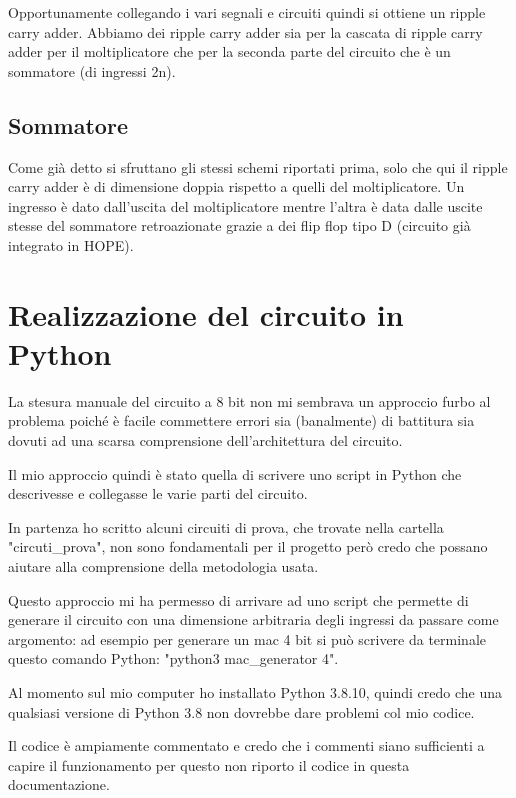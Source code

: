 \documentclass[12pt, letterpaper]{article}
\begin{document}
Opportunamente collegando i vari segnali e circuiti quindi si ottiene un ripple carry adder.
Abbiamo dei ripple carry adder sia per la cascata di ripple carry adder per il moltiplicatore che per la seconda parte del circuito che è un sommatore (di ingressi 2n).

\subsection{Sommatore}
Come già detto si sfruttano gli stessi schemi riportati prima, solo che qui il ripple carry adder è di dimensione doppia rispetto a quelli del moltiplicatore.
Un ingresso è dato dall'uscita del moltiplicatore mentre l'altra è data dalle uscite stesse del sommatore retroazionate grazie a dei flip flop tipo D (circuito già integrato in HOPE).

\section{Realizzazione del circuito in Python}

La stesura manuale del circuito a 8 bit non mi sembrava un approccio furbo al problema poiché è facile commettere errori sia (banalmente) di battitura sia dovuti ad una scarsa comprensione dell'architettura del circuito.

Il mio approccio quindi è stato quella di scrivere uno script in Python che descrivesse e collegasse le varie parti del circuito.  

In partenza ho scritto alcuni circuiti di prova, che trovate nella cartella "circuti\_prova", non sono fondamentali per il progetto però credo che possano aiutare alla comprensione della metodologia usata.

Questo approccio mi ha permesso di arrivare ad uno script che permette di generare il circuito con una dimensione arbitraria degli ingressi da passare come argomento: ad esempio per generare un mac 4 bit si può scrivere da terminale questo comando Python: "python3 mac\_generator 4".

Al momento sul mio computer ho installato Python 3.8.10, quindi credo che una qualsiasi versione di Python 3.8 non dovrebbe dare problemi col mio codice.

Il codice è ampiamente commentato e credo che i commenti siano sufficienti a capire il funzionamento per questo non riporto il codice in questa documentazione.
\end{document}
